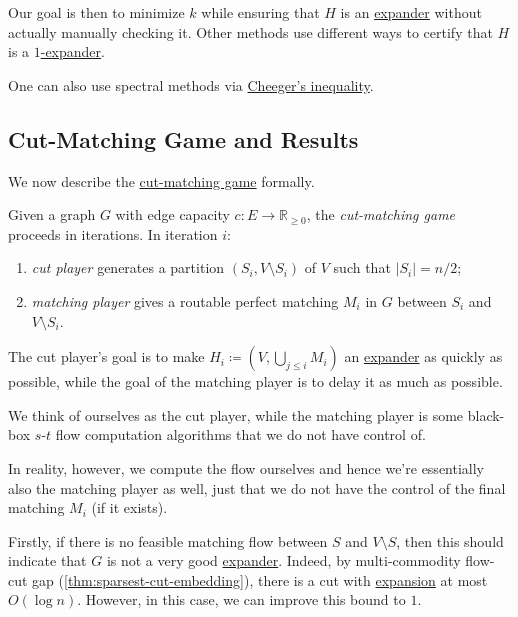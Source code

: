 Our goal is then to minimize \(k\) while ensuring that \(H\) is an \hyperref[def:expander]{expander} without actually manually checking it. Other methods use different ways to certify that \(H\) is a \hyperref[def:expander]{\(1\)-expander}.

\begin{eg}
	One can also use spectral methods via \hyperref[thm:Cheeger-inequality]{Cheeger's inequality}.
\end{eg}

\subsection{Cut-Matching Game and Results}
We now describe the \hyperref[def:cut-matching-game]{cut-matching game} formally.

\begin{definition}\label{def:cut-matching-game}
	Given a graph \(G\) with edge capacity \(c\colon E \to \mathbb{R} _{\geq 0}\), the \emph{cut-matching game} proceeds in iterations. In iteration \(i\):
	\begin{enumerate}
		\item \emph{cut player} generates a partition \((S_i, V\setminus S_i)\) of \(V\) such that \(\lvert S_i \rvert = n / 2\);
		\item \emph{matching player} gives a routable perfect matching \(M_i\) in \(G\) between \(S_i\) and \(V \setminus S_i\).
	\end{enumerate}
	The cut player's goal is to make \(H_i \coloneqq (V, \bigcup_{j \leq i} M_i)\) an \hyperref[def:expander]{expander} as quickly as possible, while the goal of the matching player is to delay it as much as possible.
\end{definition}

We think of ourselves as the cut player, while the matching player is some black-box \(s\)-\(t\) flow computation algorithms that we do not have control of.

\begin{intuition}
	In reality, however, we compute the flow ourselves and hence we're essentially also the matching player as well, just that we do not have the control of the final matching \(M_i\) (if it exists).
\end{intuition}

Firstly, if there is no feasible matching flow between \(S\) and \(V\setminus S\), then this should indicate that \(G\) is not a very good \hyperref[def:expander]{expander}. Indeed, by multi-commodity flow-cut gap (\autoref{thm:sparsest-cut-embedding}), there is a cut with \hyperref[def:expansion]{expansion} at most \(O(\log n)\). However, in this case, we can improve this bound to \(1\).

